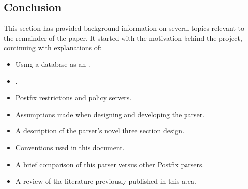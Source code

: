 \documentclass[a4paper,12pt,draft]{article}
\begin{document}
%

\subsection{Conclusion}

This section has provided background information on several topics relevant
to the remainder of the paper.  It started with the motivation behind the
project, continuing with explanations of:

\begin{itemize}

    \item Using a database as an \API{}.

    \item \SMTP{}.

    \item Postfix restrictions and policy servers.

    \item Assumptions made when designing and developing the parser.

    \item A description of the parser's novel three section design.

    \item Conventions used in this document.

    \item A brief comparison of this parser versus other Postfix parsers.

    \item A review of the literature previously published in this area.

\end{itemize}
\end{document}
